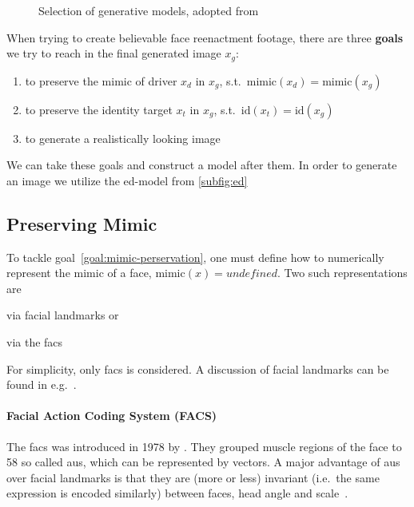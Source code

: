 \begin{figure}[h]
    \centering
    \caption{Selection of generative models, adopted from~\cite{Mirsky.2020}}\label{fig:generative-models}
\end{figure}

When trying to create believable face reenactment footage, there are three \textbf{goals}
we try to reach in the final generated image \(x_g\):
\begin{enumerate}[1.)]
    \item to preserve the mimic of driver \(x_d\) in \(x_g\), s.t.\ \(\text{mimic}(x_d)=\text{mimic}(x_g)\)\label{goal:mimic-perservation}
    \item to preserve the identity target \(x_t\) in \(x_g\), s.t.\ \(\text{id}(x_t)=\text{id}(x_g)\)\label{goal:preserve-identity}
    \item to generate a realistically looking image\label{goal:increase-realism}
\end{enumerate}
We can take these goals and construct a model after them. In order to generate
an image we utilize the \gls{ed}-model from \cref{subfig:ed}

\subsection{Preserving Mimic}
To tackle goal~\ref{goal:mimic-perservation}, one must define how to
numerically represent the mimic of a face, \(\text{mimic}(x)=\textit{undefined}\).
Two such representations are
\begin{enumerate*}[a.)]
    \item via facial landmarks or
    \item via the \gls{facs}
\end{enumerate*}
For simplicity, only \gls{facs} is considered. A discussion of facial landmarks
can be found in e.g.\ \cite{Ha.2020}.

\paragraph*{Facial Action Coding System (FACS)}
The \gls{facs} was introduced in 1978 by \textcite{Ekman.1978}. They grouped
muscle regions of the face to 58 so called \glspl{au}, which can be represented
by vectors. A major advantage of \glspl{au} over facial landmarks is that they
are (more or less) invariant (i.e.\ the same expression is encoded similarly)
between faces, head angle and scale~\cite{Pham.2018}.


